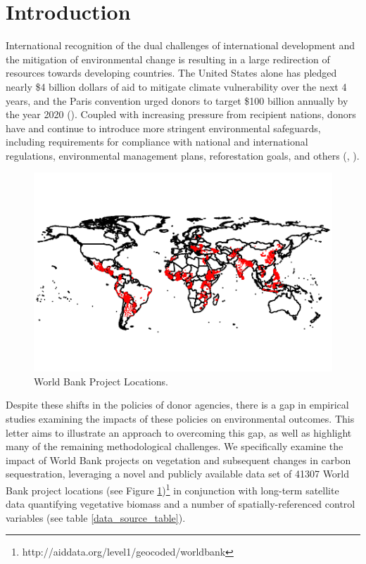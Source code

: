 \documentclass{article}\usepackage[]{graphicx}\usepackage[]{color}
\makeatletter
\def\maxwidth{ %
  \ifdim\Gin@nat@width>\linewidth
    \linewidth
  \else
    \Gin@nat@width
  \fi
}
\newenvironment{knitrout}{}{}  %
\makeatother
\begin{document}
\begin{knitrout}
\section{Introduction}
International recognition of the dual challenges of international development and the mitigation of environmental change is resulting in a large redirection of resources towards developing countries. 
The United States alone has pledged nearly \$4 billion dollars of aid to mitigate climate vulnerability over the next 4 years, and the Paris convention urged donors to target \$100 billion annually by the year 2020 (\cite{royal_united_2015}). 
Coupled with increasing pressure from recipient nations, donors have and continue to introduce more stringent environmental safeguards, including requirements for compliance with national and international regulations, environmental management plans, reforestation goals, and others (\cite{nielson_delegation_2003}, \cite{gutner_explaining_2005}).

\begin{figure}\centering
\begin{Schunk}

\includegraphics[width=\maxwidth]{figure/WLocs-1} \end{Schunk}
\caption{World Bank Project Locations.}
\label{WBLocs}
\vspace{25pt}
\end{figure}  

\par
Despite these shifts in the policies of donor agencies, there is a gap in empirical studies examining the impacts of these policies on environmental outcomes.  
This letter aims to illustrate an approach to overcoming this gap, as well as highlight many of the remaining methodological challenges.
We specifically examine the impact of World Bank projects on vegetation and subsequent changes in carbon sequestration, leveraging a novel and publicly available data set of 41307 World Bank project locations (see Figure \ref{WBLocs})\footnote{http://aiddata.org/level1/geocoded/worldbank} in conjunction with long-term satellite data quantifying vegetative biomass and a number of spatially-referenced control variables (see table \ref{data_source_table}).


\end{knitrout}
\end{document}
